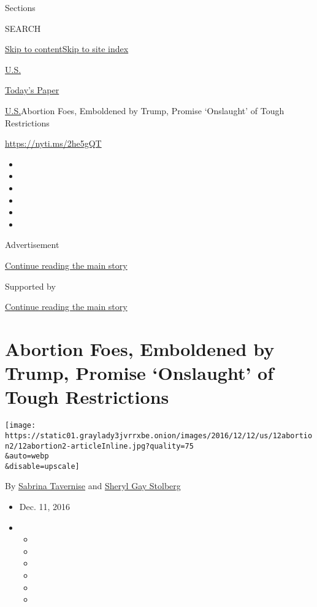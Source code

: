 Sections

SEARCH

\protect\hyperlink{site-content}{Skip to
content}\protect\hyperlink{site-index}{Skip to site index}

\href{https://www.nytimes3xbfgragh.onion/section/us}{U.S.}

\href{https://myaccount.nytimes3xbfgragh.onion/auth/login?response_type=cookie\&client_id=vi}{}

\href{https://www.nytimes3xbfgragh.onion/section/todayspaper}{Today's
Paper}

\href{/section/us}{U.S.}\textbar{}Abortion Foes, Emboldened by Trump,
Promise `Onslaught' of Tough Restrictions

\url{https://nyti.ms/2he5gQT}

\begin{itemize}
\item
\item
\item
\item
\item
\item
\end{itemize}

Advertisement

\protect\hyperlink{after-top}{Continue reading the main story}

Supported by

\protect\hyperlink{after-sponsor}{Continue reading the main story}

\hypertarget{abortion-foes-emboldened-by-trump-promise-onslaught-of-tough-restrictions}{%
\section{Abortion Foes, Emboldened by Trump, Promise `Onslaught' of
Tough
Restrictions}\label{abortion-foes-emboldened-by-trump-promise-onslaught-of-tough-restrictions}}

\texttt{[image: https://static01.graylady3jvrrxbe.onion/images/2016/12/12/us/12abortion2/12abortion2-articleInline.jpg?quality=75\\\&auto=webp\\\&disable=upscale]}

By \href{http://www.nytimes3xbfgragh.onion/by/sabrina-tavernise}{Sabrina
Tavernise} and
\href{http://www.nytimes3xbfgragh.onion/by/sheryl-gay-stolberg}{Sheryl
Gay Stolberg}

\begin{itemize}
\item
  Dec. 11, 2016
\item
  \begin{itemize}
  \item
  \item
  \item
  \item
  \item
  \item
  \end{itemize}
\end{itemize}

